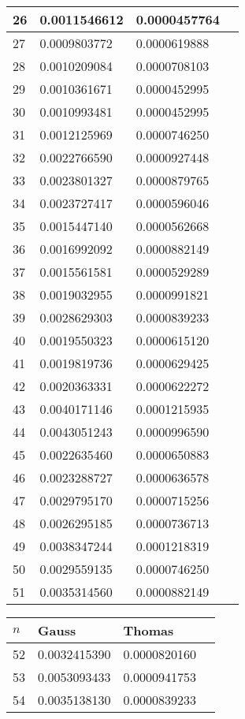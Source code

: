 \documentclass{article}
\begin{document}
\begin{table}[H]
{\begin{tabular}{|l|l|l|l|}
26 & 0.0011546612 & 0.0000457764 \\ \hline
27 & 0.0009803772 & 0.0000619888 \\ \hline
28 & 0.0010209084 & 0.0000708103 \\ \hline
29 & 0.0010361671 & 0.0000452995 \\ \hline
30 & 0.0010993481 & 0.0000452995 \\ \hline
31 & 0.0012125969 & 0.0000746250 \\ \hline
32 & 0.0022766590 & 0.0000927448 \\ \hline
33 & 0.0023801327 & 0.0000879765 \\ \hline
34 & 0.0023727417 & 0.0000596046 \\ \hline
35 & 0.0015447140 & 0.0000562668 \\ \hline
36 & 0.0016992092 & 0.0000882149 \\ \hline
37 & 0.0015561581 & 0.0000529289 \\ \hline
38 & 0.0019032955 & 0.0000991821 \\ \hline
39 & 0.0028629303 & 0.0000839233 \\ \hline
40 & 0.0019550323 & 0.0000615120 \\ \hline
41 & 0.0019819736 & 0.0000629425 \\ \hline
42 & 0.0020363331 & 0.0000622272 \\ \hline
43 & 0.0040171146 & 0.0001215935 \\ \hline
44 & 0.0043051243 & 0.0000996590 \\ \hline
45 & 0.0022635460 & 0.0000650883 \\ \hline
46 & 0.0023288727 & 0.0000636578 \\ \hline
47 & 0.0029795170 & 0.0000715256 \\ \hline
48 & 0.0026295185 & 0.0000736713 \\ \hline
49 & 0.0038347244 & 0.0001218319 \\ \hline
50 & 0.0029559135 & 0.0000746250 \\ \hline
51 & 0.0035314560 & 0.0000882149 \\ \hline
\end{tabular}
}
\parbox{.45\linewidth}{
\begin{tabular}{|l|l|l|l|}
\hline
$n$ & Gauss & Thomas \\ \hline
52 & 0.0032415390 & 0.0000820160 \\ \hline
53 & 0.0053093433 & 0.0000941753 \\ \hline
54 & 0.0035138130 & 0.0000839233 \\ \hline

\end{tabular}}
\end{table}
\end{document}
